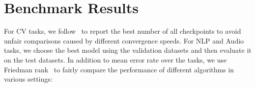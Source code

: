 \documentclass{article}
\begin{document}
\begin{table}[t!]
\centering
\caption{Essential components used in  SSL algorithms supported in USB. PL, CR, Dist. Align., and W-S Aug., MSE, CE are the abbreviations for Pseudo Labeling, Consistency Regularization, Distribution Alignment, Weak-Strong Augmentation, Mean Squared Error, and Cross-Entropy, respectively. PL denotes hard `one-hot' labels adopted in CR Loss.}
\label{tab-algs-components}
\end{table}

\section{Benchmark Results}

For CV tasks, we follow~\cite{zhang2021flexmatch} to report the best number of all checkpoints to avoid unfair comparisons caused by different convergence speeds. For NLP and Audio tasks, we choose the best model using the validation datasets and then evaluate it on the test datasets.
In addition to mean error rate over the tasks, we use Friedman rank~\cite{friedman1937use,friedman1940comparison} to fairly compare the performance of different algorithms in various settings:
\end{document}
